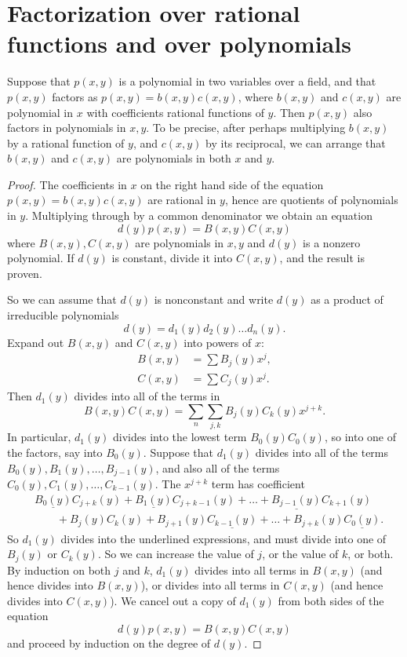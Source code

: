 \section{Factorization over rational functions and over polynomials}
\begin{proposition}\label{proposition:Gauss.lemma}
Suppose that \(p(x,y)\) is a polynomial in two variables over a field, and that \(p(x,y)\) factors as \(p(x,y)=b(x,y)c(x,y)\), where \(b(x,y)\) and \(c(x,y)\) are polynomial in \(x\) with coefficients rational functions of \(y\).
Then \(p(x,y)\) also factors in polynomials in \(x,y\).
To be precise, after perhaps multiplying \(b(x,y)\) by a rational function of \(y\), and \(c(x,y)\) by its reciprocal, we can arrange that \(b(x,y)\) and \(c(x,y)\) are polynomials in both \(x\) and \(y\).
\end{proposition}
\begin{proof}
The coefficients in \(x\) on the right hand side of the equation
\(p(x,y) = b(x,y)c(x,y)\) are rational in \(y\), hence are quotients of polynomials in \(y\). Multiplying through by a common denominator we obtain an equation 
\[
d(y)p(x,y) = B(x,y)C(x,y)
\]
where \(B(x,y), C(x,y)\) are polynomials in \(x,y\) and \(d(y)\) is a nonzero polynomial. 
If \(d(y)\) is constant, divide it into \(C(x,y)\), and the result is proven.

So we can assume that \(d(y)\) is nonconstant and write \(d(y)\) as a product of irreducible polynomials
\[
d(y) = d_1(y)d_2(y) \dots d_n(y).
\]
Expand out \(B(x,y)\) and \(C(x,y)\) into powers of \(x\):
\begin{align*}
B(x,y) &= \sum B_j(y)x^j, \\
C(x,y) &= \sum C_j(y)x^j.
\end{align*}
Then \(d_1(y)\) divides into all of the terms in 
\[
B(x,y)C(x,y)= \sum_n \sum_{j,k} B_j(y)C_k(y) x^{j+k}.
\]
In particular, \(d_1(y)\) divides into the lowest term \(B_0(y)C_0(y)\), so into one of the factors, say into \(B_0(y)\).
Suppose that \(d_1(y)\) divides into all of the terms \(B_0(y), B_1(y), \dots, B_{j-1}(y)\), and also all of the terms \(C_0(y), C_1(y), \dots, C_{k-1}(y)\).
The \(x^{j+k}\) term has coefficient
\begin{align*}
& \underline{B_0(y)} C_{j+k}(y) + \underline{B_1(y)} C_{j+k-1}(y) + \dots + \underline{B_{j-1}(y)} C_{k+1}(y) \\
& \qquad + B_j(y) C_k(y) + B_{j+1}(y) \underline{C_{k-1}(y)} + \dots + B_{j+k}(y) \underline{C_0(y)}.
\end{align*}
So \(d_1(y)\) divides into the underlined expressions, and must divide into one of \(B_j(y)\) or \(C_k(y)\).
So we can increase the value of \(j\), or the value of \(k\), or both.
By induction on both \(j\) and \(k\), \(d_1(y)\) divides into all terms in \(B(x,y)\) (and hence divides into \(B(x,y)\)), or divides into all terms in \(C(x,y)\) (and hence divides into \(C(x,y)\)).
We cancel out a copy of \(d_1(y)\) from both sides of the equation
\[
d(y)p(x,y) = B(x,y)C(x,y)
\]
and proceed by induction on the degree of \(d(y)\).
\end{proof}
